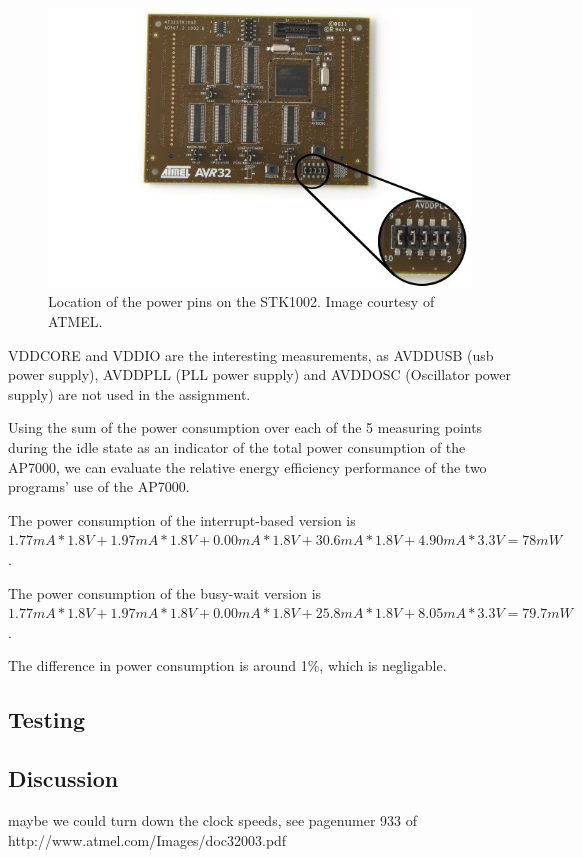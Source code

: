 \begin{figure}
\includegraphics[width = \textwidth]{results-and-tests/power-pins-location.jpg}
\caption{Location of the power pins on the STK1002. Image courtesy of ATMEL.}
\label{power-pins-location}
\end{figure}

VDDCORE and VDDIO are the interesting measurements, as AVDDUSB (usb power supply), AVDDPLL (PLL power supply) and AVDDOSC (Oscillator power supply) are not used in the assignment.

Using the sum of the power consumption over each of the 5 measuring points during the idle state as an indicator of the total power consumption of the AP7000, we can evaluate the relative energy efficiency performance of the two programs' use of the AP7000.

The power consumption of the interrupt-based version is 
$
1.77mA * 1.8V +
1.97mA * 1.8V +
0.00mA * 1.8V +
30.6mA * 1.8V +
4.90mA * 3.3V
=
78mW
$
.

The power consumption of the busy-wait version is 
$
1.77mA * 1.8V +
1.97mA * 1.8V +
0.00mA * 1.8V +
25.8mA * 1.8V +
8.05mA * 3.3V
=
79.7mW
$
.

The difference in power consumption is around 1\%, which is negligable.


\subsection{Testing}

	

\subsection{Discussion}

maybe we could turn down the clock speeds, see pagenumer 933 of http://www.atmel.com/Images/doc32003.pdf
